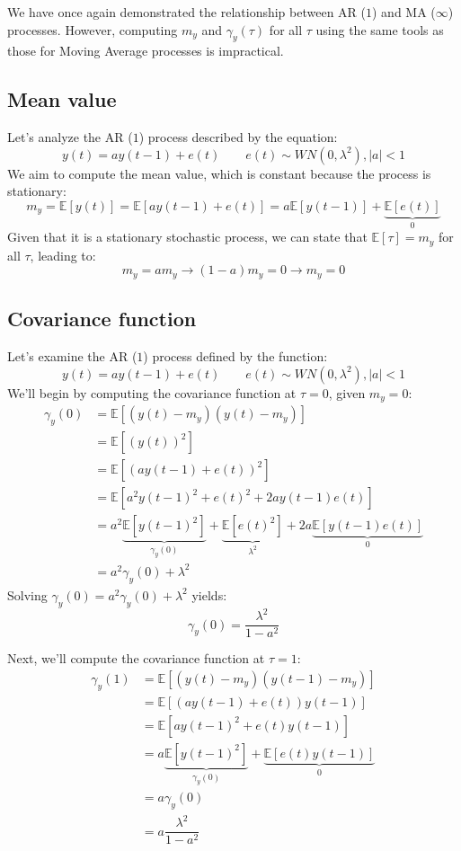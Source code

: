 We have once again demonstrated the relationship between AR ($1$) and MA ($\infty$) processes. 
However, computing $m_y$ and $\gamma_y(\tau)$ for all $\tau$ using the same tools as those for Moving Average processes is impractical.

\subsection{Mean value}
Let's analyze the AR ($1$) process described by the equation:
\[y(t)=ay(t-1)+e(t) \qquad e(t)\sim WN(0,\lambda^2),\left\lvert a \right\rvert<1\]
We aim to compute the mean value, which is constant because the process is stationary:
\[m_y=\mathbb{E}\left[y(t)\right]=\mathbb{E}\left[ay(t-1)+e(t)\right]=a\mathbb{E}\left[y(t-1)\right]+\underbrace{\mathbb{E}\left[e(t)\right]}_0\]
Given that it is a stationary stochastic process, we can state that  $\mathbb{E}\left[\tau\right]=m_y$ for all $\tau$, leading to:
\[m_y=am_y\rightarrow (1-a)m_y=0\rightarrow m_y=0\]

\subsection{Covariance function}
Let's examine the AR ($1$) process defined by the function:
\[y(t)=ay(t-1)+e(t) \qquad e(t)\sim WN(0,\lambda^2),\left\lvert a \right\rvert<1\]
We'll begin by computing the covariance function at $\tau=0$, given $m_y=0$:
\begin{align*}
    \gamma_y(0) &=\mathbb{E}\left[ \left(y(t)-m_y\right)\left(y(t)-m_y\right) \right] \\
                &=\mathbb{E}\left[ {\left(y(t)\right)}^2 \right] \\
                &=\mathbb{E}\left[ {\left(ay(t-1)+e(t)\right)}^2 \right] \\      
                &=\mathbb{E}\left[ a^2{y(t-1)}^2+{e(t)}^2+2ay(t-1)e(t) \right] \\     
                &=a^2\underbrace{\mathbb{E}\left[ {y(t-1)}^2\right]}_{\gamma_y(0)} +\underbrace{\mathbb{E}\left[{e(t)}^2\right]}_{\lambda^2} +2a\underbrace{\mathbb{E}\left[y(t-1)e(t)\right]}_{0}  \\    
                &=a^2\gamma_y(0) +\lambda^2 
\end{align*}
Solving $\gamma_y(0)=a^2\gamma_y(0) +\lambda^2$ yields:
\[\gamma_y(0)=\dfrac{\lambda^2}{1-a^2}\]

Next, we'll compute the covariance function at $\tau=1$:
\begin{align*}
    \gamma_y(1) &=\mathbb{E}\left[ \left(y(t)-m_y\right)\left(y(t-1)-m_y\right) \right] \\
                &=\mathbb{E}\left[ \left(ay(t-1)+e(t)\right)y(t-1) \right] \\
                &=\mathbb{E}\left[ a{y(t-1)}^2+e(t)y(t-1) \right] \\     
                &=a\underbrace{\mathbb{E}\left[ {y(t-1)}^2\right]}_{\gamma_y(0)} +\underbrace{\mathbb{E}\left[ e(t)y(t-1) \right]}_0  \\  
                &=a\gamma_y(0) \\
                &=a\dfrac{\lambda^2}{1-a^2}
\end{align*}

